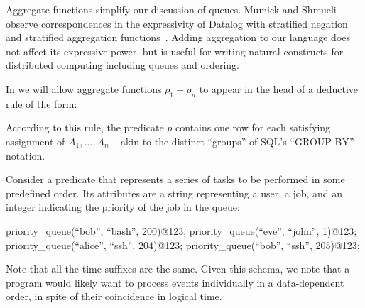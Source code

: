Aggregate functions simplify our discussion of queues.  Mumick and Shmueli observe correspondences in the expressivity of Datalog with stratified negation and stratified aggregation functions~\cite{mumickshmueli}.  Adding aggregation to our language does not affect its expressive power, but is useful for writing natural constructs for distributed computing including queues and ordering.  

In \lang we will allow
aggregate functions $\rho_1 - \rho_n$ to appear
in the head of a deductive rule of the form:

\linebreak{}

According to this rule, the predicate $p$ contains one row for each satisfying assignment of $A_1, \ldots, A_n$ -- akin to the distinct ``groups'' of SQL's ``GROUP BY'' notation.



Consider a predicate  that represents a series of tasks to be performed in some predefined order.  Its attributes are a string representing a user, a job, and an integer
indicating the priority of the job in the queue:

\begin{Dedalus}
priority\_queue(``bob'', ``bash'', 200)@123;
priority\_queue(``eve'', ``john'', 1)@123;
priority\_queue(``alice'', ``ssh'', 204)@123;
priority\_queue(``bob'', ``ssh'', 205)@123;
\end{Dedalus}

Note that all the time suffixes are the same.  
Given this schema, we note that a program would likely want to process
 events individually in a data-dependent order, in
spite of their coincidence in logical time.  


